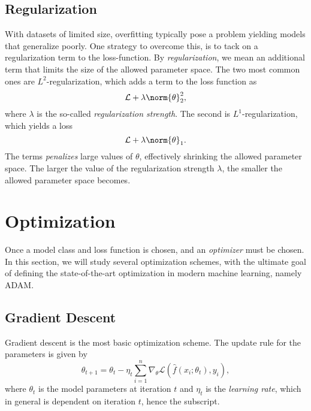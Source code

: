 \subsection{Regularization}
With datasets of limited size, overfitting typically pose a problem yielding models that generalize poorly. 
One strategy to overcome this, is to tack on a regularization term to the loss-function. By \textit{regularization},
we mean an additional term that limits the size of the allowed parameter space. The two most common ones are 
$L^2$-regularization, which adds a term to the loss function as
\begin{equation}
	\mathcal{L} + \lambda \norm{\theta}_2^2,
\end{equation}
where $\lambda$ is the so-called \textit{regularization strength}.
The second is $L^1$-regularization, which yields a loss 
\begin{equation}
	\mathcal{L} + \lambda\norm{\theta}_1.
\end{equation}
The terms \textit{penalizes} large values of $\theta$, effectively shrinking the allowed parameter space.
The larger the value of the regularization strength $\lambda$, the smaller the allowed parameter space becomes.

\section{Optimization}
Once a model class and loss function is chosen, and an \textit{optimizer} must be chosen. In this section, we will
study several optimization schemes, with the ultimate goal of defining the state-of-the-art optimization in modern
machine learning, namely ADAM.

\subsection{Gradient Descent}
Gradient descent is the most basic optimization scheme. The update rule for the parameters is given by 
\begin{equation}
	\theta_{t+1} = \theta_t - \eta_t \sum_{i=1}^n \nabla_\theta \mathcal{L}(\hat{f}(x_i; \theta_t), y_i),
\end{equation}
where $\theta_t$ is the model parameters at iteration $t$ and $\eta_t$ is the \textit{learning rate}, 
which in general is dependent on iteration $t$, hence the subscript.
